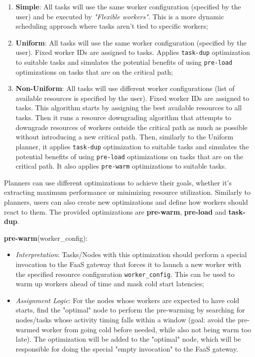 \documentclass[conference]{IEEEtran}
\begin{document}
\begin{enumerate}
    \item \textbf{Simple}: All tasks will use the same worker configuration (specified by the user) and be executed by \textit{"Flexible workers"}. This is a more dynamic scheduling approach where tasks aren't tied to specific workers;
    \item \textbf{Uniform}: All tasks will use the same worker configuration (specified by the user). Fixed worker IDs are assigned to tasks. Applies \texttt{task-dup} optimization to suitable tasks and simulates the potential benefits of using \texttt{pre-load} optimizations on tasks that are on the critical path;
    \item \textbf{Non-Uniform}: All tasks will use different worker configurations (list of available resources is specified by the user). Fixed worker IDs are assigned to tasks. This algorithm starts by assigning the best available resources to all tasks. Then it runs a resource downgrading algorithm that attempts to downgrade resources of workers outside the critical path as much as possible without introducing a new critical path. Then, similarly to the Uniform planner, it applies \texttt{task-dup} optimization to suitable tasks and simulates the potential benefits of using \texttt{pre-load} optimizations on tasks that are on the critical path. It also applies \texttt{pre-warm} optimizations to suitable tasks.
\end{enumerate}

Planners can use different optimizations to achieve their goals, whether it's extracting maximum performance or minimizing resource utilization. Similarly to planners, users can also create new optimizations and define how workers should react to them. The provided optimizations are \textbf{pre-warm}, \textbf{pre-load} and \textbf{task-dup}.

\textbf{pre-warm}(worker\_config):
\begin{itemize}
  \item \textit{Interpretation}: Tasks/Nodes with this optimization should perform a special invocation to the FaaS gateway that forces it to launch a new worker with the specified resource configuration \texttt{worker\_config}. This can be used to warm up workers ahead of time and mask cold start latencies;
  \item \textit{Assignment Logic}: For the nodes whose workers are expected to have cold starts, find the "optimal" node to perform the pre-warming by searching for nodes/tasks whose activity timing falls within a window (goal: avoid the pre-warmed worker from going cold before needed, while also not being warm too late). The optimization will be added to the "optimal" node, which will be responsible for doing the special "empty invocation" to the FaaS gateway.
\end{itemize}
\end{document}
